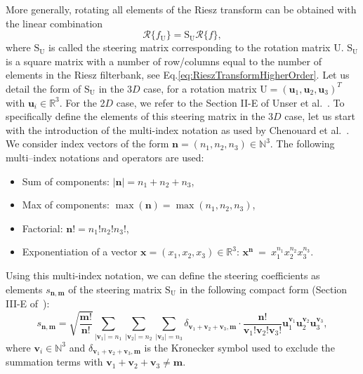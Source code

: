 \documentclass[fleqn,a4paper,oneside,openany]{book}
\begin{document}
More generally, rotating all elements of the Riesz transform can be obtained with the linear combination
\begin{equation}\label{eq:steerability}
    \boldsymbol{\mathcal{R}}\{f_{\mathrm{U}}\}=
    \mathrm{S}_{\mathrm{U}}\boldsymbol{\mathcal{R}}\{f\},
\end{equation}
where $\mathrm{S}_{\mathrm{U}}$ is called the steering matrix corresponding to the rotation matrix $\mathrm{U}$.
$\mathrm{S}_{\mathrm{U}}$ is a square matrix with a number of row/columns equal to the number of elements in the Riesz filterbank, see Eq.\eqref{eq:RieszTransformHigherOrder}.
Let us detail the form of $\mathrm{S}_{\mathrm{U}}$ in the 3$D$ case, for a rotation matrix $\mathrm{U} = (\boldsymbol{u}_1,\boldsymbol{u}_2,\boldsymbol{u}_3)^T$ with $\boldsymbol{u}_i\in\mathbb{R}^3$.
For the 2$D$ case, we refer to the Section II-E of Unser et al.~\cite{UnV2010}.
To specifically define the elements of this steering matrix in the 3$D$ case, let us start with the introduction of the multi-index notation as used by Chenouard et al.~\cite{ChU2012}.
We consider index vectors of the form $\boldsymbol{n} = (n_1, n_2, n_3) \in \mathbb{N}^3$. The following multi--index notations and operators are used:
\begin{itemize}
\item Sum of components: $|\boldsymbol{n}| = n_1+n_2+n_3$,
\item Max of components: $\max(\boldsymbol{n}) = \max(n_1,n_2,n_3)$,
\item Factorial: $\boldsymbol{n}! = n_1!n_2!n_3!$,
\item Exponentiation of a vector $\boldsymbol{x} = (x_1, x_2, x_3) \in \mathbb{R}^3$: $\boldsymbol{x}^{\boldsymbol{n}}~=~x_1^{n_1}x_2^{n_2}x_3^{n_3}$.
\end{itemize}
%
Using this multi-index notation, we can define the steering coefficients as elements $s_{\boldsymbol{n},\boldsymbol{m}}$ of the steering matrix $\mathrm{S}_{\mathrm{U}}$ in the following compact form (Section III-E of~\cite{ChU2012}): 
%
\begin{equation}\label{eq:steeringMatrix3D}
s_{\boldsymbol{n},\boldsymbol{m}} = \sqrt{\frac{\boldsymbol{m}!}{\boldsymbol{n}!}}
\sum_{\mid \boldsymbol{v}_1 \mid = n_1}{\sum_{\mid \boldsymbol{v}_2 \mid = n_2}{\sum_{\mid \boldsymbol{v}_3 \mid = n_3}{
\delta_{\boldsymbol{v}_1 + \boldsymbol{v}_2 + \boldsymbol{v}_3,\boldsymbol{m}}}}}
\cdot \frac{\boldsymbol{n}!}{\boldsymbol{v}_1!\boldsymbol{v}_2!\boldsymbol{v}_3!}
\boldsymbol{u}_1^{\boldsymbol{v}_1}\boldsymbol{u}_2^{\boldsymbol{v}_2}\boldsymbol{u}_3^{\boldsymbol{v}_3}, \nonumber
\end{equation}
%
where $\boldsymbol{v}_i \in \mathbb{N}^3$ and $\delta_{\boldsymbol{v}_1 + \boldsymbol{v}_2 + \boldsymbol{v}_3,\boldsymbol{m}}$ is the Kronecker symbol used to exclude the summation terms with $\boldsymbol{v}_1 + \boldsymbol{v}_2 + \boldsymbol{v}_3 \neq \boldsymbol{m}$.
\end{document}

